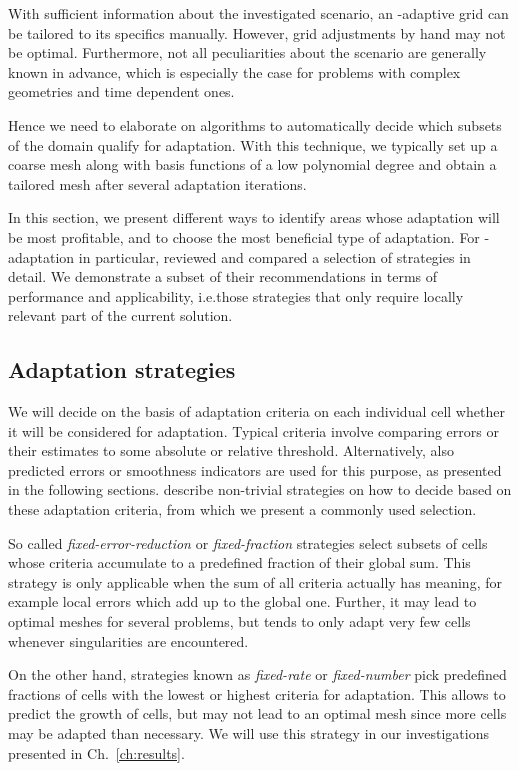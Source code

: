 With sufficient information about the investigated scenario, an \hp-adaptive grid can be tailored to its specifics manually. However, grid adjustments by hand may not be optimal. Furthermore, not all peculiarities about the scenario are generally known in advance, which is especially the case for problems with complex geometries and time dependent ones.

Hence we need to elaborate on algorithms to automatically decide which subsets of the domain qualify for adaptation. With this technique, we typically set up a coarse mesh along with basis functions of a low polynomial degree and obtain a tailored mesh after several adaptation iterations.

In this section, we present different ways to identify areas whose adaptation will be most profitable, and to choose the most beneficial type of adaptation. For \hp-adaptation in particular, \textcite{mitchell2014} reviewed and compared a selection of strategies in detail. We demonstrate a subset of their recommendations in terms of performance and applicability, i.e.\@ those strategies that only require locally relevant part of the current solution.



\subsection{Adaptation strategies}
\label{ssec:strategy}

We will decide on the basis of adaptation criteria on each individual cell whether it will be considered for adaptation. Typical criteria involve comparing errors or their estimates to some absolute or relative threshold. Alternatively, also predicted errors or smoothness indicators are used for this purpose, as presented in the following sections. \textcite[Sec.~5.2]{bangerth2003} describe non-trivial strategies on how to decide based on these adaptation criteria, from which we present a commonly used selection.

So called \textit{fixed-error-reduction} or \textit{fixed-fraction} strategies select subsets of cells whose criteria accumulate to a predefined fraction of their global sum. This strategy is only applicable when the sum of all criteria actually has meaning, for example local errors which add up to the global one. Further, it may lead to optimal meshes for several problems, but tends to only adapt very few cells whenever singularities are encountered.

On the other hand, strategies known as \textit{fixed-rate} or \textit{fixed-number} pick predefined fractions of cells with the lowest or highest criteria for adaptation. This allows to predict the growth of cells, but may not lead to an optimal mesh since more cells may be adapted than necessary. We will use this strategy in our investigations presented in Ch.~\ref{ch:results}.

